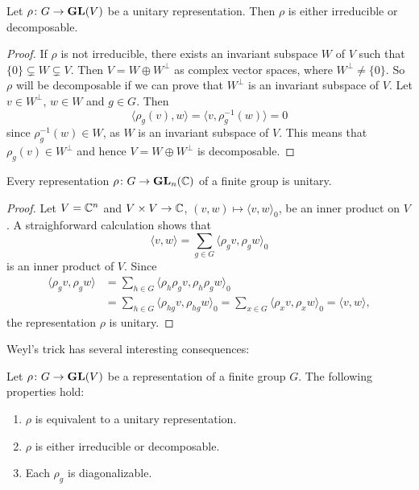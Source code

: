 \begin{proposition}
\label{pro:irr_or_dec}
Let $\rho\colon G\to\mathbf{GL}(V)$ be a unitary representation. Then $\rho$ is either
irreducible or decomposable.
\end{proposition}

\begin{proof}
	If $\rho$ is not irreducible, there exists an invariant subspace $W$ of $V$ such that
	$\{0\}\subsetneq W\subsetneq V$. 
	Then $V=W\oplus W^{\perp}$ as complex vector spaces, where 
	$W^\perp\ne\{0\}$. So $\rho$ will be decomposable if we can prove that
	$W^\perp$ is an invariant subspace of $V$. 
	Let $v\in W^\perp$, $w\in W$ and $g\in G$. Then  
	\[
	\langle \rho_g(v),w\rangle=\langle v,\rho_g^{-1}(w)\rangle=0   
	\]
	since $\rho_g^{-1}(w)\in W$, as $W$ is an invariant subspace of $V$. This means that 
	$\rho_g(v)\in W^\perp$ and hence $V=W\oplus W^{\perp}$ is decomposable.  
\end{proof}

\begin{theorem}
    Every representation $\rho\colon G\to\mathbf{GL}_n(\mathbb{C})$ 
    of a finite group is unitary.
\end{theorem}

\begin{proof}
	Let $V=\mathbb{C}^n$ and 
	$V\times V\to\mathbb{C}$, $(v,w)\mapsto\langle v,w\rangle_0$, be an inner
    product on $V$. A straighforward calculation shows that
    \[
    \langle v,w\rangle=\sum_{g\in G}\langle\rho_gv,\rho_gw\rangle_0
    \]
    is an inner product of $V$. Since
    \begin{align*}
    \langle\rho_gv,\rho_gw\rangle&=\sum_{h\in G}\langle\rho_h\rho_gv,\rho_h\rho_gw\rangle_0\\
    &=\sum_{h\in G}\langle\rho_{hg}v,\rho_{hg}w\rangle_0=\sum_{x\in G}\langle\rho_xv,\rho_xw\rangle_0=\langle v,w\rangle,
    \end{align*}
    the representation $\rho$ is unitary.
\end{proof}

\label{rho_diagonalizable}
Weyl's trick has several interesting consequences:  

\begin{corollary}
	Let $\rho\colon G\to\mathbf{GL}(V)$ be a representation of a finite group $G$. The following properties
	hold:
	\begin{enumerate}
		\item $\rho$ is equivalent to a unitary representation.
		\item $\rho$ is either irreducible or decomposable.
		\item Each $\rho_g$ is diagonalizable. 
	\end{enumerate}
\end{corollary}

